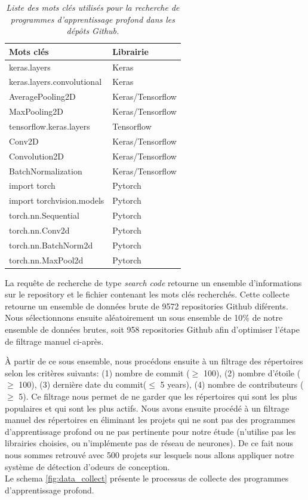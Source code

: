 \begin{table}[h]
  \centering
  \caption{\emph{Liste des mots clés utilisés pour la recherche de programmes d'apprentissage profond dans les dépôts Github.}}
  \label{tab:keywords}
  \begin{tabular}{ll}
    \toprule
    \textbf{Mots clés}         & \textbf{Librairie} \\ \midrule
    keras.layers               & Keras              \\
    keras.layers.convolutional & Keras              \\
    AveragePooling2D           & Keras/Tensorflow   \\
    MaxPooling2D               & Keras/Tensorflow   \\
    tensorflow.keras.layers    & Tensorflow         \\
    Conv2D                     & Keras/Tensorflow   \\
    Convolution2D              & Keras/Tensorflow   \\
    BatchNormalization         & Keras/Tensorflow   \\
    import torch               & Pytorch            \\
    import torchvision.models  & Pytorch            \\
    torch.nn.Sequential        & Pytorch            \\
    torch.nn.Conv2d            & Pytorch            \\
    torch.nn.BatchNorm2d       & Pytorch            \\
    torch.nn.MaxPool2d         & Pytorch            \\ \bottomrule
  \end{tabular}
\end{table}


La requête de recherche de type \emph{search code} retourne un ensemble
d'informations sur le repository et le fichier contenant les mots clés
recherchés. Cette collecte retourne un ensemble de données brute de 9572
repositories Github diférents. Nous sélectionnons ensuite aléatoirement un sous
ensemble de 10\% de notre ensemble de données brutes, soit 958 repositories
Github afin d'optimiser l'étape de filtrage manuel ci-après.

À partir de ce sous ensemble, nous procédons ensuite à un filtrage des répertoires selon les
critères suivants: (1) nombre de commit ($\geq$ 100), (2) nombre d'étoile ($\geq$ 100), (3) dernière date du
commit($\leq$ 5 years), (4) nombre de contributeurs ($\geq$ 5). Ce filtrage nous permet de ne garder que
les répertoires qui sont les plus populaires et qui sont les plus actifs. Nous
avons ensuite procédé à un filtrage manuel des répertoires en éliminant les
projets qui ne sont pas des programmes d'apprentissage profond ou ne pas
pertinente pour notre étude (n'utilise pas les librairies choisies, ou
n'implémente pas de réseau de neurones). De ce fait nous nous sommes retrouvé
avec 500 projets sur lesquels nous allons appliquer notre système de détection
d'odeurs de conception.\\ Le schema \ref{fig:data_collect} présente le processus
de collecte des programmes d'apprentissage profond.\\


